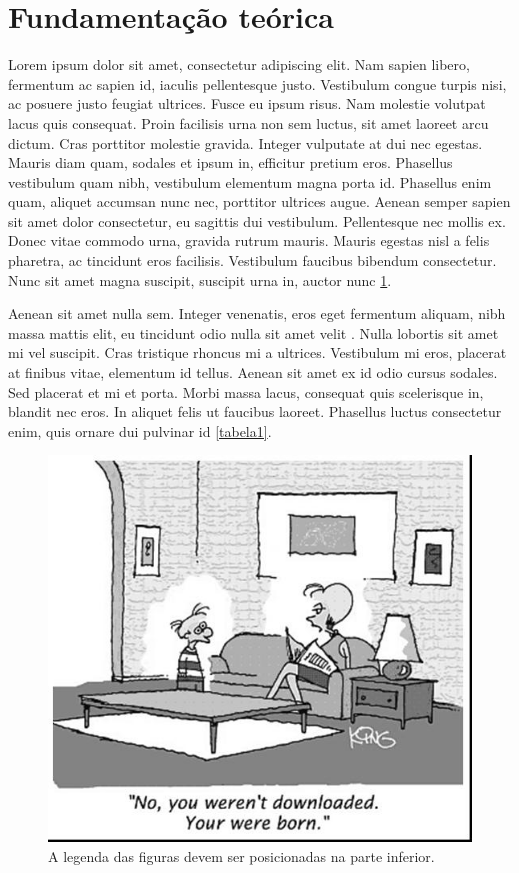 \section{Fundamentação teórica}
Lorem ipsum dolor sit amet, consectetur adipiscing elit. Nam sapien libero, fermentum ac sapien id, iaculis pellentesque justo. Vestibulum congue turpis nisi, ac posuere justo feugiat ultrices. Fusce eu ipsum risus. Nam molestie volutpat lacus quis consequat. Proin facilisis urna non sem luctus, sit amet laoreet arcu dictum. Cras porttitor molestie gravida. Integer vulputate at dui nec egestas. Mauris diam quam, sodales et ipsum in, efficitur pretium eros. Phasellus vestibulum quam nibh, vestibulum elementum magna porta id. Phasellus enim quam, aliquet accumsan nunc nec, porttitor ultrices augue. Aenean semper sapien sit amet dolor consectetur, eu sagittis dui vestibulum. Pellentesque nec mollis ex. Donec vitae commodo urna, gravida rutrum mauris. Mauris egestas nisl a felis pharetra, ac tincidunt eros facilisis. Vestibulum faucibus bibendum consectetur. Nunc sit amet magna suscipit, suscipit urna in, auctor nunc \ref{figura1}.

Aenean sit amet nulla sem. Integer venenatis, eros eget fermentum aliquam, nibh massa mattis elit, eu tincidunt odio nulla sit amet velit \cite{knuth:84}. Nulla lobortis sit amet mi vel suscipit. Cras tristique rhoncus mi a ultrices. Vestibulum mi eros, placerat at finibus vitae, elementum id tellus. Aenean sit amet ex id odio cursus sodales. Sed placerat et mi et porta. Morbi massa lacus, consequat quis scelerisque in, blandit nec eros. In aliquet felis ut faucibus laoreet. Phasellus luctus consectetur enim, quis ornare dui pulvinar id \ref{tabela1}.

\begin{figure}
\centering
\includegraphics[width=.5\textwidth]{secoes/figuras/fig1.jpg}
\caption{A legenda das figuras devem ser posicionadas na parte inferior.}
\label{figura1}
\end{figure}